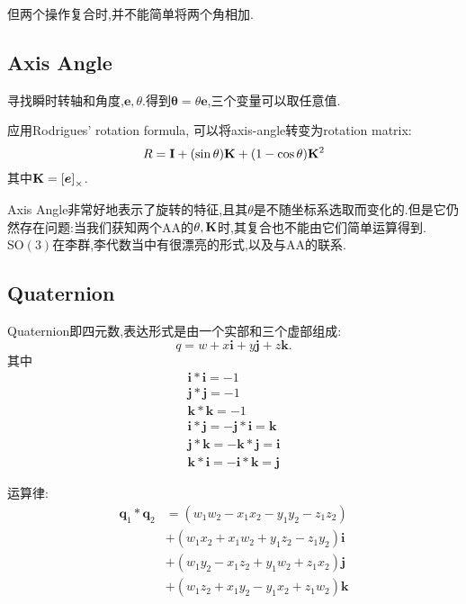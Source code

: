 但两个操作复合时,并不能简单将两个角相加.

\subsection{Axis Angle}
寻找瞬时转轴和角度,$\bm e, \theta$.得到$\bm \theta = \theta \bm e$,三个变量可以取任意值.

应用Rodrigues’ rotation formula, 可以将axis-angle转变为rotation matrix:
\begin{equation}
    R=\bold{I}+(\sin \theta) \bold{K}+(1-\cos \theta) \bold{K}^{2}
\end{equation}
其中$\bold{K} = \left[ \boldsymbol e\right]_{\times}$.

Axis Angle非常好地表示了旋转的特征,且其$\theta$是不随坐标系选取而变化的.但是它仍然存在问题:当我们获知两个AA的$\theta, \bold{K}$时,其复合也不能由它们简单运算得到.$\mathrm{SO(3)}$在李群,李代数当中有很漂亮的形式,以及与AA的联系.

\subsection{Quaternion}
Quaternion即四元数,表达形式是由一个实部和三个虚部组成:
\begin{equation}
    q = w + x \bm i + y \bm j + z \bm k.
\end{equation}
其中
\begin{equation}
    \begin{array}{c}
        \mathbf{i} * \mathbf{i}=-1 \\
        \mathbf{j} * \mathbf{j}=-1 \\
        \mathbf{k} * \mathbf{k}=-1 \\
        \mathbf{i} * \mathbf{j}=-\mathbf{j} * \mathbf{i}=\mathbf{k} \\
        \mathbf{j} * \mathbf{k}=-\mathbf{k} * \mathbf{j}=\mathbf{i} \\
        \mathbf{k} * \mathbf{i}=-\mathbf{i} * \mathbf{k}=\mathbf{j}
    \end{array}
\end{equation}

运算律:
\begin{equation}
    \begin{aligned}
        \mathbf{q}_{1} * \mathbf{q}_{2} &=\left(w_{1} w_{2}-x_{1} x_{2}-y_{1} y_{2}-z_{1} z_{2}\right) \\
        &+\left(w_{1} x_{2}+x_{1} w_{2}+y_{1} z_{2}-z_{1} y_{2}\right) \mathbf{i} \\
        &+\left(w_{1} y_{2}-x_{1} z_{2}+y_{1} w_{2}+z_{1} x_{2}\right) \mathbf{j} \\
        &+\left(w_{1} z_{2}+x_{1} y_{2}-y_{1} x_{2}+z_{1} w_{2}\right) \mathbf{k}
    \end{aligned}
\end{equation}

